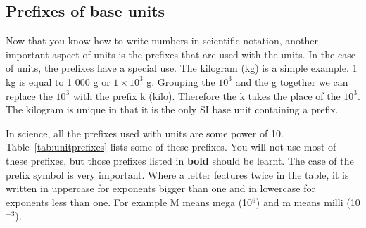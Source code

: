 \subsection*{Prefixes of base units}
            \nopagebreak
Now that you know how to write numbers in scientific notation, another important aspect of units is the prefixes that are used with the units. In the case of units, the prefixes have a special use. The kilogram (kg) is a simple example. 1 kg is equal to 1 000 g or $1\ensuremath{\times}{10}^{3}$ g. Grouping the ${10}^{3}$ and the g together we can replace the ${10}^{3}$ with the prefix k (kilo). Therefore the k takes the place of the ${10}^{3}$. The kilogram is unique in that it is the only SI base unit containing a prefix.\\

In science, all the prefixes used with units are some power of 10. Table~\ref{tab:unitprefixes} lists some of these prefixes. You will not use most of these prefixes, but those prefixes listed in \textbf{bold} should be learnt. The case of the prefix symbol is very important. Where a letter features twice in the table, it is written in uppercase for exponents bigger than one and in lowercase for exponents less than one. For example M means mega (10${}^{6}$) and m means milli (10${}^{-3}$).


